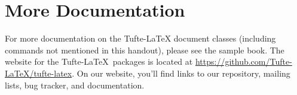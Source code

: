 \documentclass{tufte-handout}
\begin{document}
\section{More Documentation}\label{sec:more-doc}
For more documentation on the Tufte-\LaTeX{} document classes (including commands not
mentioned in this handout), please see the sample book. The website for the Tufte-\LaTeX\ packages is located at \url{https://github.com/Tufte-LaTeX/tufte-latex}.  On our website, you'll find links to our  repository, mailing lists, bug tracker, and documentation.




\end{document}
